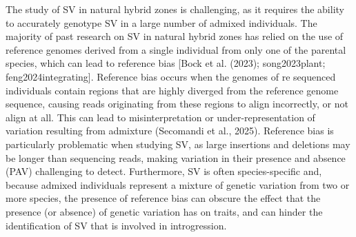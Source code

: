 \documentclass[
]{agujournal2019}
\begin{document}
The study of SV in natural hybrid zones is challenging, as it requires
the ability to accurately genotype SV in a large number of admixed
individuals. The majority of past research on SV in natural hybrid zones
has relied on the use of reference genomes derived from a single
individual from only one of the parental species, which can lead to
reference bias {[}Bock et al. (2023); song2023plant;
feng2024integrating{]}. Reference bias occurs when the genomes of re
sequenced individuals contain regions that are highly diverged from the
reference genome sequence, causing reads originating from these regions
to align incorrectly, or not align at all. This can lead to
misinterpretation or under-representation of variation resulting from
admixture (Secomandi et al., 2025). Reference bias is particularly
problematic when studying SV, as large insertions and deletions may be
longer than sequencing reads, making variation in their presence and
absence (PAV) challenging to detect. Furthermore, SV is often
species-specific and, because admixed individuals represent a mixture of
genetic variation from two or more species, the presence of reference
bias can obscure the effect that the presence (or absence) of genetic
variation has on traits, and can hinder the identification of SV that is
involved in introgression.
\end{document}
